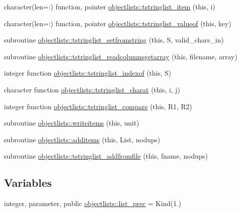 \begin{DoxyCompactItemize}
character(len=\+:) function, pointer \mbox{\hyperlink{namespaceobjectlists_ab724d2c89c530b6df64385c55bdc6377}{objectlists\+::tstringlist\+\_\+item}} (this, i)
\item 
character(len=\+:) function, pointer \mbox{\hyperlink{namespaceobjectlists_a8003d8e93e59241bcea25f30d0b95b5a}{objectlists\+::tstringlist\+\_\+valueof}} (this, key)
\item 
subroutine \mbox{\hyperlink{namespaceobjectlists_a2c19308a10df8614e054244fe735e6d1}{objectlists\+::tstringlist\+\_\+setfromstring}} (this, S, valid\+\_\+chars\+\_\+in)
\item 
subroutine \mbox{\hyperlink{namespaceobjectlists_adea8776aebb466be94d770772a73f756}{objectlists\+::tstringlist\+\_\+readcolumnsgetarray}} (this, filename, array)
\item 
integer function \mbox{\hyperlink{namespaceobjectlists_a926298e78fd013f34f503ab38a3bc496}{objectlists\+::tstringlist\+\_\+indexof}} (this, S)
\item 
character function \mbox{\hyperlink{namespaceobjectlists_abe1b434a57e0d690b22c8410ca9cfff0}{objectlists\+::tstringlist\+\_\+charat}} (this, i, j)
\item 
integer function \mbox{\hyperlink{namespaceobjectlists_a2050ccdefc2f19e1dbc8fac3a91d51d0}{objectlists\+::tstringlist\+\_\+compare}} (this, R1, R2)
\item 
subroutine \mbox{\hyperlink{namespaceobjectlists_a1735569cf51270522157e13dfdcedcc3}{objectlists\+::writeitems}} (this, unit)
\item 
subroutine \mbox{\hyperlink{namespaceobjectlists_a4891ff4be9767fe63e6223924e02c450}{objectlists\+::additems}} (this, List, nodups)
\item 
subroutine \mbox{\hyperlink{namespaceobjectlists_a53c9a728110b79f25cc56f9b63554deb}{objectlists\+::tstringlist\+\_\+addfromfile}} (this, fname, nodups)
\end{DoxyCompactItemize}
\subsection*{Variables}
\begin{DoxyCompactItemize}
\item 
integer, parameter, public \mbox{\hyperlink{namespaceobjectlists_a9d176bc6347eefeceba8cb520c6be81c}{objectlists\+::list\+\_\+prec}} = Kind(1.)
\end{DoxyCompactItemize}
